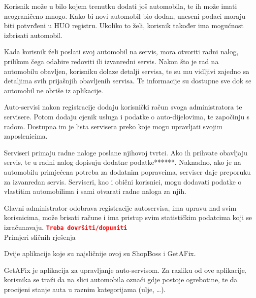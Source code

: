 		Korisnik može u bilo kojem trenutku dodati još automobila, te ih može imati neograničeno mnogo. Kako bi novi automobil bio dodan, uneseni podaci moraju biti potvrđeni u HUO registru. Ukoliko to želi, korisnik također ima mogućnost izbrisati automobil.
		 
		Kada korisnik želi poslati svoj automobil na servis, mora otvoriti radni nalog, prilikom čega odabire redoviti ili izvanredni servis. Nakon što je rad na automobilu obavljen, korisniku dolaze detalji servisa, te su mu vidljivi zajedno sa detaljima svih prijašnjih obavljenih servisa. Te informacije su dostupne sve dok se automobil ne obriše iz aplikacije.
		
		Auto-servisi nakon registracije dodaju korisnički račun svoga administratora te servisere. Potom dodaju cjenik usluga i podatke o auto-dijelovima, te započinju s radom. Dostupna im je lista servisera preko koje mogu upravljati svojim zaposlenicima.  
		
		Serviseri primaju radne naloge poslane njihovoj tvrtci. Ako ih prihvate obavljaju servis, te u radni nalog dopisuju dodatne podatke******. Naknadno, ako je na automobilu primjećena potreba za dodatnim popravcima, serviser daje preporuku za izvanredan servis. Serviseri, kao i obični korisnici, mogu dodavati podatke o vlastitim automobilima i sami otvarati radne naloga za njih.
		
		Glavni administrator odobrava registracije autoservisa, ima upravu nad svim korisnicima, može brisati račune i ima pristup svim statističkim podatcima koji se izračunavaju. \textbf{\texttt{\textcolor{red}{Treba dovršiti/dopuniti}}} \\
		
		\newpage
		\Large Primjeri sličnih rješenja
		
		\normalsize Dvije aplikacije koje su najsličnije ovoj su ShopBoss i GetAFix. 
		
		GetAFix je aplikacija za upravljanje auto-servisom. Za razliku od ove aplikacije, korisnika se traži da na slici automobila označi gdje postoje ogrebotine, te da procijeni stanje auta u raznim kategorijama (ulje, \ldots).
		
